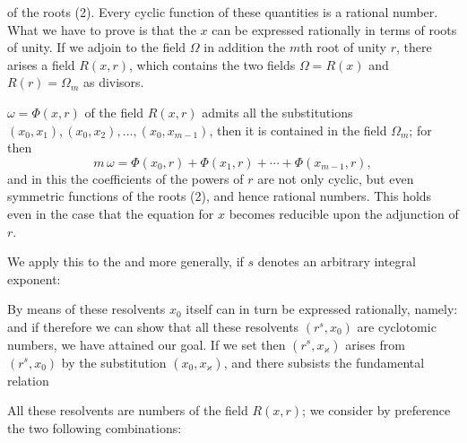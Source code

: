 of the roots (2). Every cyclic function of these quantities is
a rational number. What we have to prove is that the $x$ can be
expressed rationally in terms of roots of unity. If we adjoin
to the field $\Omega$ in addition the $m$th root of unity $r$, there
arises a field $R(x, r)$, which contains the two fields $\Omega = R(x)$ and
$R(r) = \Omega_m$ as divisors.

 $\omega = \Phi(x, r)$ of the field $R(x, r)$ admits
all the substitutions $(x_0, x_1), (x_0, x_2), \ldots, (x_0, x_{m-1})$,
then it is contained in the field $\Omega_m$; for then
\[
m\,\omega = \Phi(x_0, r) + \Phi(x_1, r) + \cdots + \Phi(x_{m-1}, r),
\]
and in this the coefficients of the powers of $r$ are not only
cyclic, but even symmetric functions of the roots
(2), and hence rational numbers. This holds even in the
case that the equation for $x$ becomes reducible upon the adjunction
of $r$.

We apply this to the 
and more generally, if $s$ denotes an arbitrary integral exponent:

By means of these resolvents $x_0$ itself can in turn be expressed
rationally, namely:
and if therefore we can show that all these resolvents
$(r^s, x_0)$ are cyclotomic numbers, we have attained our
goal. If we set
then $(r^s, x_{\varkappa})$ arises from $(r^s, x_0)$ by the substitution
$(x_0, x_{\varkappa})$, and there subsists the fundamental relation

All these resolvents are numbers of the field $R(x, r)$;
we consider by preference the two following combinations:
